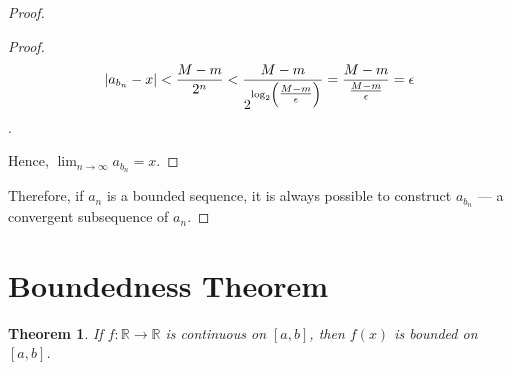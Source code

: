 \documentclass[11pt]{article}
\newtheorem*{theorem*}{Theorem}
\begin{document}
\begin{proof}
\begin{adjustwidth}{1cm}{}
\begin{proof}
		\[ \abs{a_{b_{n}} - x} < \frac{M-m}{2^n} < \frac{M-m}{2^{\log_2 \left(\tfrac{M-m}{\epsilon}\right)}} = \frac{M-m}{\tfrac{M-m}{\epsilon}} = \epsilon \].
		
		Hence, $\displaystyle{\lim_{n \to \infty}} a_{b_{n}} = x$. 
	\end{proof}
\end{adjustwidth}

Therefore, if $a_n$ is a bounded sequence, it is always possible to construct $a_{b_{n}}$ --- a convergent subsequence of $a_n$.

\end{proof}


\section{Boundedness Theorem}

\begin{theorem*}
	If $f \colon \mathbb{R} \to \mathbb{R}$ is continuous on $[a, b]$, then $f(x)$ is bounded on $[a, b]$.
\end{theorem*}
\end{document}
